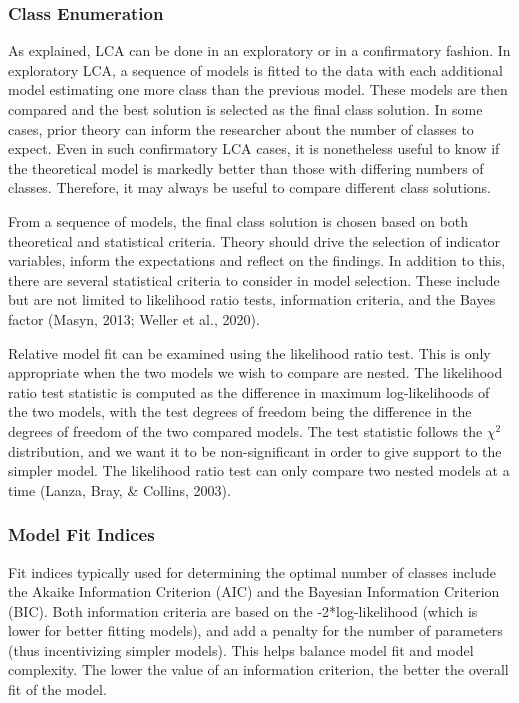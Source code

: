 \documentclass[
  ,man,floatsintext]{apa6}
\begin{document}
\hypertarget{class-enumeration}{%
\subsubsection{Class Enumeration}\label{class-enumeration}}

As explained, LCA can be done in an exploratory or in a confirmatory
fashion. In exploratory LCA, a sequence of models is fitted to the data
with each additional model estimating one more class than the previous
model. These models are then compared and the best solution is selected
as the final class solution. In some cases, prior theory can inform the
researcher about the number of classes to expect. Even in such
confirmatory LCA cases, it is nonetheless useful to know if the
theoretical model is markedly better than those with differing numbers
of classes. Therefore, it may always be useful to compare different
class solutions.

From a sequence of models, the final class solution is chosen based on
both theoretical and statistical criteria. Theory should drive the
selection of indicator variables, inform the expectations and reflect on
the findings. In addition to this, there are several statistical
criteria to consider in model selection. These include but are not
limited to likelihood ratio tests, information criteria, and the Bayes
factor (Masyn, 2013; Weller et al., 2020).

Relative model fit can be examined using the likelihood ratio test. This
is only appropriate when the two models we wish to compare are nested.
The likelihood ratio test statistic is computed as the difference in
maximum log-likelihoods of the two models, with the test degrees of
freedom being the difference in the degrees of freedom of the two
compared models. The test statistic follows the \(\chi^2\) distribution,
and we want it to be non-significant in order to give support to the
simpler model. The likelihood ratio test can only compare two nested
models at a time (Lanza, Bray, \& Collins, 2003).

\hypertarget{model-fit-indices}{%
\subsubsection{Model Fit Indices}\label{model-fit-indices}}

Fit indices typically used for determining the optimal number of classes
include the Akaike Information Criterion (AIC) and the Bayesian
Information Criterion (BIC). Both information criteria are based on the
-2*log-likelihood (which is lower for better fitting models), and add a
penalty for the number of parameters (thus incentivizing simpler
models). This helps balance model fit and model complexity. The lower
the value of an information criterion, the better the overall fit of the
model.
\end{document}

